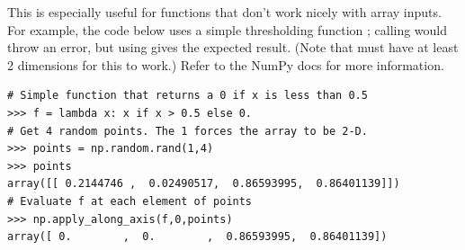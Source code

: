 \begin{problem}
\begin{enumerate}
This is especially useful for functions that don't work nicely with array inputs. 
For example, the code below uses a simple thresholding function ; calling  would throw an error, but using  gives the expected result. 
(Note that  must have at least 2 dimensions for this to work.) 
Refer to the NumPy docs for more information.
\begin{lstlisting}
# Simple function that returns a 0 if x is less than 0.5
>>> f = lambda x: x if x > 0.5 else 0.
# Get 4 random points. The 1 forces the array to be 2-D.
>>> points = np.random.rand(1,4) 
>>> points   
array([[ 0.2144746 ,  0.02490517,  0.86593995,  0.86401139]])
# Evaluate f at each element of points
>>> np.apply_along_axis(f,0,points) 
array([ 0.        ,  0.        ,  0.86593995,  0.86401139])
\end{lstlisting}

\end{enumerate}
\end{problem}

